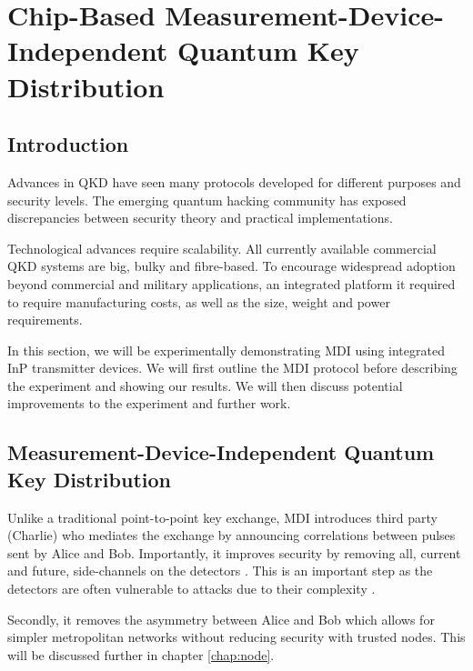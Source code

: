 %
%
\graphicspath{{./chapters/chapter04/fig04/}}

\let\textcircled=\pgftextcircled
\chapter[Chip-Based Measurement-Device-Independent QKD]{Chip-Based Measurement-Device-Independent Quantum Key Distribution}
\label{chap:mdiqkd}

\section{Introduction}

Advances in \ac{QKD} have seen many protocols developed for different purposes and security levels. The emerging quantum hacking community has exposed discrepancies between security theory and practical implementations. 

Technological advances require scalability. All currently available commercial \ac{QKD} systems are big, bulky and fibre-based. To encourage widespread adoption beyond commercial and military applications, an integrated platform it required to require manufacturing costs, as well as the size, weight and power requirements.

In this section, we will be experimentally demonstrating \ac{MDI} \cite{mdi-qkd} using integrated \ac{InP} transmitter devices. We will first outline the \ac{MDI} protocol before describing the experiment and showing our results. We will then discuss potential improvements to the experiment and further work.

\section{Measurement-Device-Independent Quantum Key Distribution}
\label{sec:mdi-qkd}

Unlike a traditional point-to-point key exchange, \ac{MDI} introduces third party (Charlie) who mediates the exchange by announcing correlations between pulses sent by Alice and Bob. Importantly, it improves security by removing all, current and future, side-channels on the detectors \cite{}. This is an important step as the detectors are often vulnerable to attacks due to their complexity \cite{}.

Secondly, it removes the asymmetry between Alice and Bob which allows for simpler metropolitan networks without reducing security with trusted nodes. This will be discussed further in chapter \ref{chap:node}.

